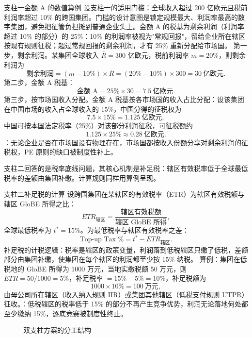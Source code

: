 \begin{derivation}{支柱一金额 A 的数值算例}{}
设支柱一的适用门槛：全球收入超过 200 亿欧元且税前利润率超过 10\% 的跨国集团。门槛的设计意图是锁定规模最大、利润率最高的数字集团，避免把征管负担摊到普通企业头上。金额 A 的税基为剩余利润（利润率超过 10\% 的部分）的 25\%：10\% 的利润率被视为"常规回报"，留给企业所在辖区按现有规则征税；超过常规回报的剩余利润，才有 25\% 重新分配给市场国。
第一步，剩余利润。某集团全球收入 $\bar{R} = 300$ 亿欧元，税前利润率 $m = 20\%$，则剩余利润为
\[
\text{剩余利润} = (m - 10\%) \times \bar{R} = (20\% - 10\%) \times 300 = 30 \ \text{亿欧元}.
\]
第二步，金额 A 税基：
\[
\text{金额 A} = 25\% \times 30 = 7.5 \ \text{亿欧元}.
\]
第三步，按市场国收入分配。金额 A 税基按各市场国的收入占比分配：设该集团在中国市场的收入占全球收入的 15\%，中国分得的征税权为
\[
7.5 \times 15\% = 1.125 \ \text{亿欧元},
\]
中国可按本国法定税率（25\%）对该部分利润征税，可征税额约
\[
1.125 \times 25\% \approx 0.28 \ \text{亿欧元}.
\]
：无论企业是否在市场国设有物理存在，市场国都按收入份额分享对剩余利润的征税权，PE 原则的缺口被制度性补上。
\end{derivation}

支柱二回答的是税率底线问题，其核心机制是补足税：辖区有效税率低于全球最低税率的差额由集团补缴。计算规则同样用算例呈现。

\begin{derivation}{支柱二补足税的计算}{}
设跨国集团在某辖区的有效税率（ETR）为辖区有效税额与辖区 GloBE 所得之比：
\[
ETR_{\text{辖区}} = \frac{\text{辖区有效税额}}{\text{辖区 GloBE 所得}},
\]
全球最低税率为 $t^* = 15\%$。为最低税率与辖区有效税率之差：
\[
\text{Top-up Tax \%} = t^* - ETR_{\text{辖区}}.
\]
补足税的计税逻辑：税率是辖区的政策变量，利润落到低税辖区只缴了低税，差额部分由集团补缴，使集团在每个辖区的利润都至少按 15\% 纳税。
算例：集团在低税地的 GloBE 所得为 1000 万元，当地实缴税额 50 万元，则 $ETR = 50/1000 = 5\%$，补足税率 $= 15\% - 5\% = 10\%$，补足税额为
\[
1000 \times 10\% = 100 \ \text{万元},
\]
由母公司所在辖区（收入纳入规则 IIR）或集团其他辖区（低税支付规则 UTPR）征收。：低税辖区的税率低于 15\% 的部分不再产生竞争优势，利润无论落地何处都至少缴纳 15\%，逐底竞赛被制度性终止。
\end{derivation}

\begin{figure}[htbp]
\centering
{}
\caption{双支柱方案的分工结构}
\label{fig:pillars}
\end{figure}

